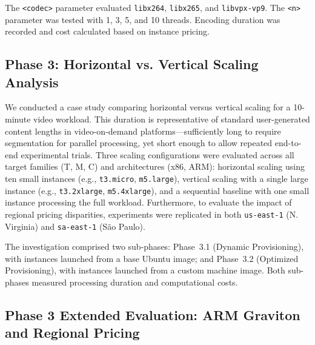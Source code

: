 \documentclass[conference]{IEEEtran}
\begin{document}
\begin{center}
	{\ttfamily\scriptsize
	}
\end{center}

The \texttt{<codec>} parameter evaluated \texttt{libx264}, \texttt{libx265},
and \texttt{libvpx-vp9}. The \texttt{<n>} parameter was tested with 1, 3, 5,
and 10 threads. Encoding duration was recorded and cost calculated based on
instance pricing.

\subsection{Phase 3: Horizontal vs. Vertical Scaling Analysis}

We conducted a case study comparing horizontal versus vertical scaling for a
10-minute video workload. This duration is representative of standard
user-generated content lengths in video-on-demand platforms---sufficiently long
to require segmentation for parallel processing, yet short enough to allow
repeated end-to-end experimental trials. Three scaling configurations were
evaluated across all target families (T, M, C) and architectures (x86, ARM): horizontal scaling using ten small instances (e.g., \texttt{t3.micro}, \texttt{m5.large}), vertical scaling with a single large instance (e.g., \texttt{t3.2xlarge}, \texttt{m5.4xlarge}), and a sequential baseline with one small instance processing the full workload. Furthermore, to evaluate the impact of regional pricing disparities, experiments were replicated in both \texttt{us-east-1} (N. Virginia) and \texttt{sa-east-1} (São Paulo).

The investigation comprised two sub-phases: Phase~3.1 (Dynamic Provisioning), with
instances launched from a base Ubuntu image; and Phase~3.2 (Optimized Provisioning), with
instances launched from a custom machine image. Both sub-phases measured
processing duration and computational costs.

\subsection{Phase 3 Extended Evaluation: ARM Graviton and Regional Pricing}
\end{document}

